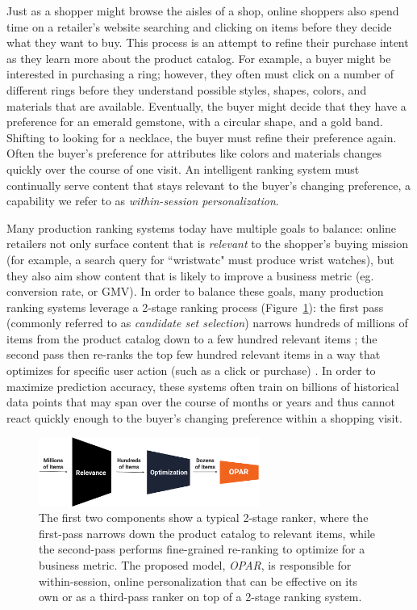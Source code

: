 \documentclass[11pt, dvipdfmx]{article}
\begin{document}
Just as a shopper might browse the aisles of a shop, online shoppers also spend time on a retailer's website searching and clicking on items before they decide what they want to buy. This process is an attempt to refine their purchase intent as they learn more about the product catalog. For example, a buyer might be interested in purchasing a ring; however, they often must click on a number of different rings before they understand possible styles, shapes, colors, and materials that are available. Eventually, the buyer might decide that they have a preference for an emerald gemstone, with a circular shape, and a gold band. Shifting to looking for a necklace, the buyer must refine their preference again.
Often the buyer's preference for attributes like colors and materials changes quickly over the course of one visit. An intelligent ranking system must continually serve content 
that stays relevant to the buyer's changing preference, a capability we refer to as \textit{within-session personalization}. 

Many production ranking systems today have multiple goals to balance: online retailers not only surface content that is \emph{relevant} to the shopper's buying mission (for example, a search query for ``wristwatc" must produce wrist watches), but they also aim show content that is likely to improve a business metric (eg. conversion rate, or GMV). In order to balance these goals, many production ranking systems leverage a 2-stage ranking process (Figure~\ref{fig:ranking_system}): the first pass (commonly referred to as \emph{candidate set selection}) narrows hundreds of millions of items from the product catalog down to a few hundred relevant items \cite{kdd20_facebook_search,kdd19_amazon_product_search, elnlp2020_itemInteraction}; the second pass then re-ranks the top few hundred relevant items in a way that optimizes for specific user action (such as a click or purchase) \cite{guo2020debiasing,kdd20_DNN_airbnb_search,pobrotyn2020contextaware,wu2018turning}. In order to maximize prediction accuracy, these systems often train on billions of historical data points that may span over the course of months or years and thus cannot react quickly enough to the buyer's changing preference within a shopping visit. 

\begin{figure}[!t]
    \centering
    \includegraphics[width=0.645\textwidth]{submissions/in_session_ranking/figs/fig_ranking_system2.pdf}
    \caption{The first two components show a typical 2-stage ranker, where the first-pass narrows down the product catalog to relevant items, while the second-pass performs fine-grained re-ranking to optimize for a business metric. The proposed model, \emph{OPAR}, is responsible for within-session, online personalization that can be effective on its own or as a third-pass ranker on top of a 2-stage ranking system.
    }
    \label{fig:ranking_system}
\end{figure}
\end{document}
